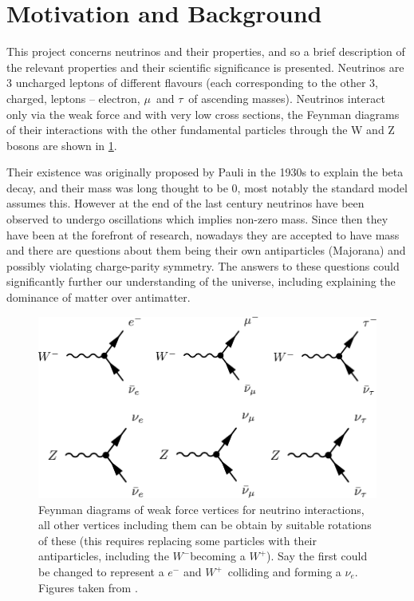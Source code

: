 \documentclass[a4paper,12pt]{article}
\newcommand{\Mu}{$\mu$}
\newcommand{\Tau}{$\tau$}
\newcommand{\Ne}{$\nu_e$}
\newcommand{\Wp}{$W^+$}
\newcommand{\Wm}{$W^-$}
\begin{document}
\pagestyle{plain}
\setcounter{page}{1}

\section{Motivation and Background}
This project concerns neutrinos and their properties, and so a brief description of the relevant properties and their scientific significance is presented.
Neutrinos are 3 uncharged leptons of different flavours (each corresponding to the other 3, charged, leptons -- electron, \Mu\ and \Tau\ of ascending masses).
Neutrinos interact only via the weak force and with very low cross sections, the Feynman diagrams of their interactions with the other fundamental particles through the W and Z bosons are shown in \cref{fig:nu_feyn}.

Their existence was originally proposed by Pauli in the 1930s to explain the beta decay, and their mass was long thought to be 0, most notably the standard model assumes this.
However at the end of the last century neutrinos have been observed to undergo oscillations which implies non-zero mass.
Since then they have been at the forefront of research, nowadays they are accepted to have mass and there are questions about them being their own antiparticles (Majorana) and possibly violating charge-parity symmetry.
The answers to these questions could significantly further our understanding of the universe, including explaining the dominance of matter over antimatter.

\begin{figure}[h]
    \centering
    \includegraphics{figures/NeutrinoFeynman.pdf}
    \caption{
        Feynman diagrams of weak force vertices for neutrino interactions, all other vertices including them can be obtain by suitable rotations of these
        (this requires replacing some particles with their antiparticles, including the \Wm becoming a \Wp).
        Say the first could be changed to represent a $e^-$ and \Wp\ colliding and forming a \Ne.
        Figures taken from \cite{potterFeynmanDiagramsParticlea}.
    }\label{fig:nu_feyn}
\end{figure}
\end{document}
